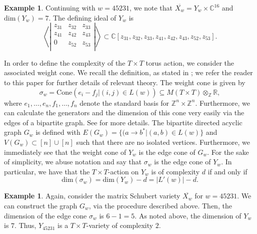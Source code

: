 \documentclass[11pt]{amsart}
\theoremstyle{definition}
\newtheorem{example}[theorem]{Example}
\theoremstyle{definition}
\theoremstyle{definition}
\theoremstyle{definition}
\newcommand{\Xw}{\overline{X_w}}
\newcommand{\Gw}{G_w}
\begin{document}
\begin{example}
    Continuing with $w=45231$, we note that $\Xw = Y_w \times \mathbb{C}^{16}$ and $\text{dim}(Y_w) = 7$. The defining ideal of $Y_w$ is
    $$\left\langle \left|\begin{array}{ccc}
        z_{31} & z_{32} & z_{33} \\
        z_{41} & z_{42} & z_{43} \\
        0 & z_{52} & z_{53} \\
    \end{array}\right|  \right\rangle  \subset \mathbb{C}[z_{31}, z_{32}, z_{33}, z_{41}, z_{42}, z_{43}, z_{52}, z_{53}].$$
\end{example}

 \noindent In order to define the complexity of the $T \times T$ torus action, we consider the associated weight cone. We recall the definition, as stated in \cite{donten2021complexity}; we refer the reader to this paper for further details of relevant theory. The weight cone is given by 
$$\sigma_w = \mathrm{Cone}(e_i-f_j|(i,j)\in L(w)) \subseteq M(T \times T) \otimes_{\mathbb Z}{\mathbb R},$$
where $e_1, \ldots, e_n,f_1, \ldots, f_n$ denote the standard basis for $\mathbb Z^n \times \mathbb Z^n$.
Furthermore, we can calculate the generators and the dimension of this cone very easily via the edges of a bipartite graph. See \cite{portakal2021rigidity} for more details. The bipartite directed acyclic graph $\Gw$ is defined with $E(\Gw) = \{(a\rightarrow b^* | (a,b)\in L(w)\}$ and $V(\Gw) \subset [n] \cup[n]$ such that there are no isolated vertices. Furthermore, we immediately see that the weight cone of $Y_w$ is the edge cone of $\Gw$. For the sake of simplicity, we abuse notation and say that $\sigma_w$ is the edge cone of $Y_w$. In particular, we have that the $T\times T$-action on $Y_w$ is of complexity $d$ if and only if
$$\mathrm{dim}(\sigma_w) = \mathrm{dim}(Y_w)-d = |L'(w)|-d.$$

\begin{example}
    Again, consider the matrix Schubert variety $\Xw$ for $w=45231$. We can construct the graph $\Gw$, via the procedure described above. Then, the dimension of the edge cone $\sigma_w$ is $6-1=5$. As noted above, the dimension of $Y_w$ is $7$. Thus, $Y_{45231}$ is a $T\times T$-variety of complexity $2$.
\begin{center}
\end{center}
    
\end{example}
\end{document}
